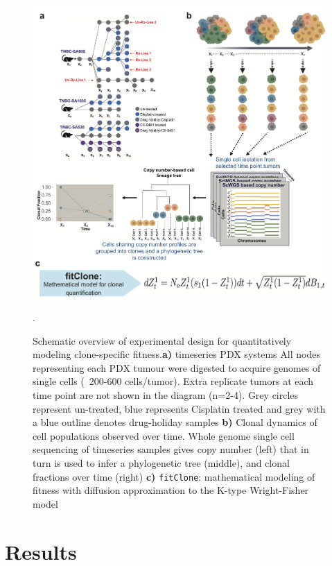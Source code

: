 \begin{figure}[H]
\centering
\includegraphics[width=\textwidth]{Figures/chap4/fig1thesischap4.png}
\caption{Schematic overview of experimental design for quantitatively modeling clone-specific fitness.\textbf{a)} timeseries PDX systems All nodes representing each PDX tumour were digested to acquire genomes of single cells (~200-600 cells/tumor). Extra replicate tumors at each time point are not shown in the diagram (n=2-4). Grey circles represent un-treated, blue represents Cisplatin treated and grey with a blue outline denotes drug-holiday samples \textbf{b)} Clonal dynamics of cell populations observed over time. Whole genome single cell sequencing of timeseries samples gives copy number (left) that in turn is used to infer a phylogenetic tree (middle), and clonal fractions over time (right) \textbf{c)} \texttt{fitClone}: mathematical modeling of fitness with diffusion approximation to the K-type Wright-Fisher model}.
\label{fig:schematic}
\end{figure}



\section{Results}


